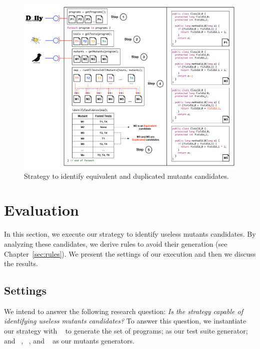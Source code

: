 \begin{figure}[ht]
	\begin{center}
		\includegraphics[scale=0.35]{images/Strategy.pdf}
		\caption{Strategy to identify equivalent and duplicated mutants candidates.}
		\label{fig:strategy}
	\end{center}
\end{figure}


\section{Evaluation}
\label{sec:strategy-evaluation}

In this section, we execute our strategy to identify useless mutants candidates. 
By analyzing these candidates, we derive rules to avoid their generation (see Chapter~\ref{sec:rules}). 
We present the settings of our execution and then we discuss the results.

\subsection{Settings}

We intend to answer the following research question: \textit{Is the strategy capable of identifying useless mutants candidates?} 
To answer this question, we instantiate our strategy with \jdolly{}~\cite{SOARES:2013:1} to generate the set of programs; \randoop{} \cite{PACHECO:2007:1} as our test suite generator; and \mujava{}~\cite{OFFUTT:2005:1, OFFUT:2006:1}, \major{}~\cite{JUST:2011:1}, and \pit{}~\cite{PIT:2017} as our mutants generators.

